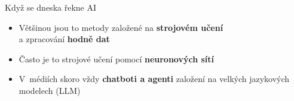 
%
%
%
%


\begin{frame}{Když se dneska řekne AI}

    \Large

    \begin{itemize}[<+->]

        \item Většinou jsou to metody založené na \textbf{strojovém učení}  \\  \quad a zpracování
            \textbf{hodně dat} \\[1em]

        \item Často je to strojové učení pomocí \textbf{neuronových sítí} \\[1em]

        \item V~médiích skoro vždy \textbf{chatboti a agenti} založení na
            velkých jazykových modelech (LLM) \\[1em]

    \end{itemize}

\end{frame}
